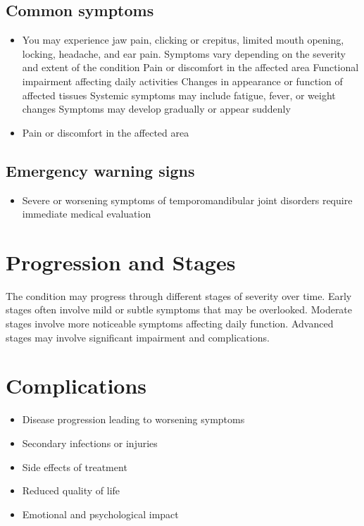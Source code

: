 \subsection{Common symptoms}
\begin{itemize}[noitemsep]
  \item You may experience jaw pain, clicking or crepitus, limited mouth opening, locking, headache, and ear pain. Symptoms vary depending on the severity and extent of the condition Pain or discomfort in the affected area Functional impairment affecting daily activities Changes in appearance or function of affected tissues Systemic symptoms may include fatigue, fever, or weight changes Symptoms may develop gradually or appear suddenly
  \item Pain or discomfort in the affected area
  \end{itemize}

\subsection{Emergency warning signs}
\begin{itemize}[noitemsep]
  \item Severe or worsening symptoms of temporomandibular joint disorders require immediate medical evaluation
\end{itemize}
\section{Progression and Stages}
The condition may progress through different stages of severity over time. Early stages often involve mild or subtle symptoms that may be overlooked. Moderate stages involve more noticeable symptoms affecting daily function. Advanced stages may involve significant impairment and complications.
\section{Complications}
\begin{itemize}[noitemsep]
  \item Disease progression leading to worsening symptoms
  \item Secondary infections or injuries
  \item Side effects of treatment
  \item Reduced quality of life
  \item Emotional and psychological impact
\end{itemize}
